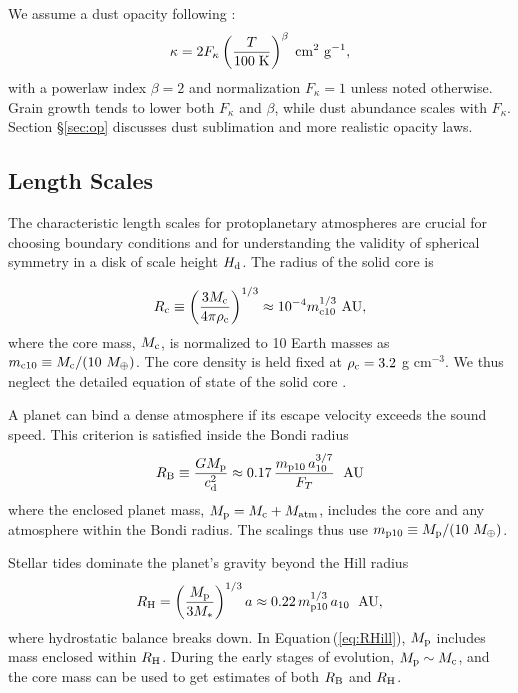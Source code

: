 \documentclass[apj, numberedappendix]{emulateapj}
\newcommand{\AU}{\; {\rm AU}}
\newcommand{\Eq}[1]{Equation\,(\ref{#1})}
\newcommand{\RB}{R_{\rm B}}
\newcommand{\RH}{R_{\rm H}}
\newcommand{\co}{_{\rm c}}
\newcommand{\pla}{_{\rm p}}
\newcommand{\di}{_{\rm d}}
\newcommand{\mcn}[1] { m_{ \rm c #1} }
\newcommand{\mpn}[1] { m_{ \rm p #1} }
\newcommand{\aun}[1]{ a_{#1} }
\begin{document}
We assume a dust opacity following \citet{bell94}:
\begin{equation}
\label{eq:opacitylaw}
\kappa= 2 F_\kappa  \left(\frac{T}{100\; \rm{K}}\right)^{\beta} \; \mathrm{cm^2 ~ g^{-1}},
\end{equation}
with a powerlaw index $\beta = 2$ and normalization $F_\kappa = 1$ unless noted otherwise. Grain growth tends to lower both $F_\kappa$ and $\beta$, while dust abundance scales with $F_\kappa$.   Section \S\ref{sec:op} discusses dust sublimation and more realistic opacity laws.


\subsection{Length Scales}
\label{sec:scales}

The characteristic length scales for protoplanetary atmospheres are crucial for choosing boundary conditions and for understanding the validity of  spherical symmetry in a disk of scale height $H\di$.  The radius of the solid core is

\begin{equation}
\label{eq:rc}
R\co \equiv \left(\frac{3 M\co}{4 \pi \rho\co}\right)^{1/3} \approx 10^{-4} \mcn{10}^{1/3} ~\text{AU},
\end{equation}
where the core mass, $M\co$, is normalized to 10 Earth masses as $\mcn{10} \equiv M\co/(10~M_\oplus)$. The core density is held fixed at $\rho\co=3.2$ g cm$^{-3}$.  We thus neglect  the detailed equation of state of the solid core \citep{fortney07}.

A planet can bind a dense atmosphere if its escape velocity exceeds the sound speed.  This criterion is satisfied inside the Bondi radius
\begin{equation}
\label{eq:RB}
\RB \equiv \frac{G M\pla}{c\di^2} \approx 0.17 \, {\mpn{10}  \, \aun{10}^{3/7} \over F_T} ~\AU
\end{equation}
where the enclosed planet mass, $M\pla = M\co + M_\mathrm{atm}$, includes the core and any atmosphere within the Bondi radius.  The scalings thus use $\mpn{10} \equiv M\pla /(10~M_\oplus)$.   

Stellar tides dominate the planet's gravity beyond the Hill radius
\begin{equation}
\label{eq:RHill}
R_{\rm H} = \left(M\pla \over 3 M_\ast \right)^{1/3}a \approx 0.22 \, {\mpn{10}^{1/3} \, \aun{10} }~\AU ,
\end{equation}
where hydrostatic balance breaks down.  In \Eq{eq:RHill}, $M\pla$ includes mass enclosed within $\RH$.  During the early stages of evolution, $M\pla \sim M\co$, and the core mass can be used to get estimates of both $\RB$ and $\RH$. 
\end{document}
